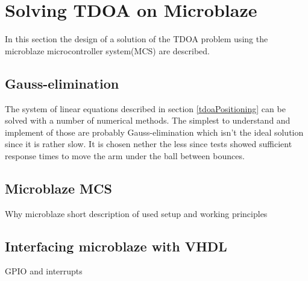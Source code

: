 \section{Solving TDOA on Microblaze}
In this section the design of a solution of the TDOA problem using the microblaze microcontroller system(MCS) are described.

\subsection{Gauss-elimination}
The system of linear equations described in section \ref{tdoaPositioning} can be solved with a number of numerical methods. The simplest to understand and implement of those are probably Gauss-elimination which isn't the ideal solution since it is rather slow. It is chosen nether the less since tests showed sufficient response times to move the arm under the ball between bounces.

\subsection{Microblaze MCS}
Why microblaze
short description of used setup and working principles

\subsection{Interfacing microblaze with VHDL}
GPIO and interrupts

